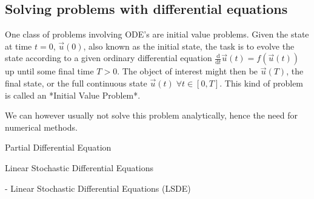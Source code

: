 \subsection{Solving problems with differential equations}
One class of problems involving ODE's are initial value problems. Given the state at time $t=0$, $\vec{u}(0)$, also known as the initial state, the task is to evolve the state according to a given ordinary differential equation $\frac{\text{d}}{\text{d}t}\vec{u}(t) = f(\vec{u}(t))$ up until some final time $T>0$. The object of interest might then be $\vec{u}(T)$, the final state, or the full continuous state $\vec{u}(t)\; \forall t\in [0, T]$. This kind of problem is called an *Initial Value Problem*. 

We can however usually not solve this problem analytically, hence the need for numerical methods.


Partial Differential Equation

Linear Stochastic Differential Equations 

- Linear Stochastic Differential Equations (LSDE)

\ifdefined\COMPILINGFROMMAIN
\else    
    
\fi